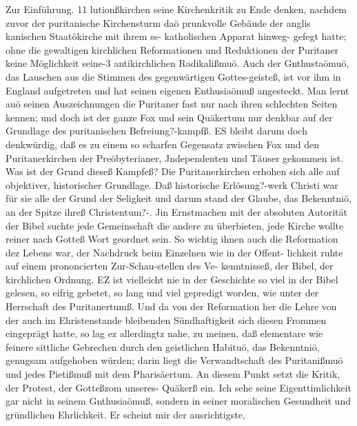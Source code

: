 Zur Einführung. 11
lutionßkirchen seine Kirchenkritik zu Ende denken, nachdem zuvor
der puritanische Kirchensturm daö prunkvolle Gebäude der anglis
kanischen Staatökirche mit ihrem ss- katholischen Apparat hinweg-
gefegt hatte; ohne die gewaltigen kirchlichen Reformationen und
Reduktionen der Puritaner keine Möglichkeit seine-3 antikirchlichen
Radikalißmuö. Auch der Gnthustaömuö, das Lauschen aus die
Stimmen des gegenwärtigen Gottes-geisteß, ist vor ihm in England
aufgetreten und hat seinen eigenen Enthusiaömuß angesteckt. Man
lernt auö seinen Auszeichnungen die Puritaner fast nur nach ihren
schlechten Seiten kennen; und doch ist der ganze Fox und sein
Quäkertum nur denkbar auf der Grundlage des puritanischen
Befreiung?-kampfß.
ES bleibt darum doch denkwürdig, daß es zu einem so
scharfen Gegensatz zwischen Fox und den Puritanerkirchen der
Preöbyterianer, Jndependenten und Täuser gekommen ist. Was
ist der Grund dieseß Kampfeß?
Die Puritanerkirchen erhohen sich alle auf objektiver, historischer
Grundlage. Daß historische Erlösung?-werk Christi war für sie
alle der Grund der Seligkeit und darum stand der Glaube, das
Bekenntniö, an der Spitze ihreß Christentum?-. Jin Ernstmachen
mit der absoluten Autorität der Bibel suchte jede Gemeinschaft
die andere zu überbieten, jede Kirche wollte reiner nach Gotteß
Wort geordnet sein. So wichtig ihnen auch die Reformation dez
Lebens war, der Nachdruck beim Einzelnen wie in der Offent-
lichkeit ruhte auf einem prononcierten Zur-Schau-stellen des Ve-
kenntnisseß, der Bibel, der kirchlichen Ordnung. EZ ist vielleicht
nie in der Geschichte so viel in der Bibel gelesen, so eifrig gebetet,
so lang und viel gepredigt worden, wie unter der Herrschaft des
Puritanertumß. Und da von der Reformation her die Lehre von
der auch im Ehristenstande bleibenden Sündhaftigkeit sich diesen
Frommen eingeprägt hatte, so lag ez allerdingtz nahe, zu meinen,
daß elementare wie feinere sittliche Gebrechen durch den geistlichen
Habituö, das Bekenntniö, genugsam aufgehoben würden; darin
liegt die Verwandtschaft des Puritanißmuö und jedes Pietißmuß
mit dem Pharisäertum.
An diesem Punkt setzt die Kritik, der Protest, der Gotteßzom
unseres- Quäkerß ein. Ich sehe seine Eigenttimlichkeit gar nicht
in seinem Gnthusiaömuß, sondern in seiner moralischen Gesundheit
und gründlichen Ehrlichkeit. Er scheint mir der ausrichtigste,


